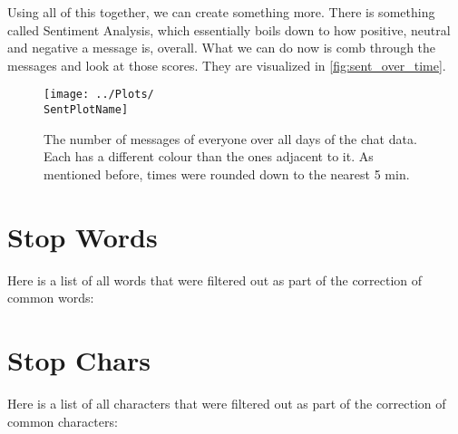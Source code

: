 \documentclass{WAReport}
\begin{document}
Using all of this together, we can create something more. There is something called Sentiment Analysis, which essentially boils down to how positive, neutral and negative a message is, overall. What we can do now is comb through the messages and look at those scores. They are visualized in \autoref{fig:sent_over_time}.

\begin{figure}[h!]
    \texttt{[image: ../Plots/\\SentPlotName]}
    \caption{The number of messages of everyone over all days of the chat data. Each has a different colour than the ones adjacent to it. As mentioned before, times were rounded down to the nearest 5 min.}
    \label{fig:sent_over_time}
\end{figure}


\clearpage
\appendix

\section{Stop Words}
\label{sec:stop_words}
Here is a list of all words that were filtered out as part of the correction of common words: \\


\clearpage

\section{Stop Chars}
\label{sec:stop_chars}
Here is a list of all characters that were filtered out as part of the correction of common characters: \\

\end{document}
